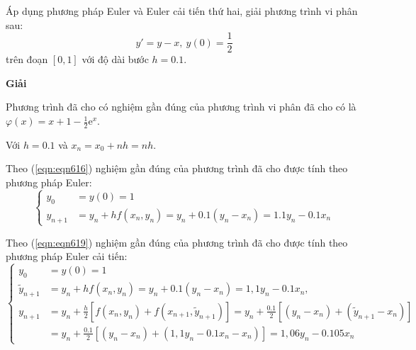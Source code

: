 \begin{example}
	Áp dụng phương pháp Euler và Euler cải tiến thứ hai, giải phương trình vi phân sau:
	$$y'=y-x,~y(0)=\frac12$$
	trên đoạn $[0,1]$ với độ dài bước $h=0.1$.\par
\end{example}

\textbf{Giải}\par
Phương trình đã cho có nghiệm gần đúng của phương trình vi phân đã cho có là $\varphi(x)=x+1-\frac12\mathrm{e}^x$.\par

Với $h=0.1$ và $x_n=x_0+nh=nh$.\par

Theo (\ref{eqn:eqn616}) nghiệm gần đúng của phương trình đã cho được tính theo phương pháp Euler:
$$\begin{cases}
	y_0&=y(0) = 1\\
	y_{n+1}& = y_n+hf(x_n,y_n)=y_n+0.1(y_n-x_n)=1.1y_n-0.1x_n
\end{cases}$$

Theo (\ref{eqn:eqn619}) nghiệm gần đúng của phương trình đã cho được tính theo phương pháp Euler cải tiến:
$$\begin{cases}
	y_0&=y(0)=1\\
	\tilde{y}_{n+1}&=y_n + hf(x_n,y_n) = y_n + 0.1 (y_n-x_n) = 1,1y_n - 0.1x_n,\\
	y_{n+1}&=y_n+\frac h2[f(x_n,y_n)+f(x_{n+1}, \tilde{y}_{n+1})]=y_n+\frac{0.1}{2}[(y_n-x_n)+(\tilde{y}_{n+1}-x_n)]\\
	~&=y_n+\frac{0.1}{2}[(y_n-x_n)+(1,1y_n-0.1x_n-x_n)]=1,06y_n-0.105x_n
\end{cases}$$

